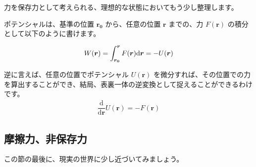 \documentclass[uplatex,dvipdfmx,a4paper,11pt]{jsarticle}
\begin{document}
力を保存力として考えられる、理想的な状態においてもう少し整理します。

ポテンシャルは、基準の位置 $\bm{r_0}$ から、任意の位置 $\bm{r}$ までの、力 $F(\bm{r})$ の積分として以下のように書けます。

	\begin{align*}
		W(\bm{r}) = \int_{\bm{r_0}}^{\bm{r}} F(\bm{r}) \mathrm{d} \bm{r} = -U(\bm{r})
	\end{align*}

逆に言えば、任意の位置でポテンシャル $U(\bm{r})$ を微分すれば、その位置での力を算出することができ、結局、表裏一体の逆変換として捉えることができるわけです。
\begin{align*}
	\dfrac{\mathrm{d}}{\mathrm{d}\bm{r}} U(\bm{r}) = -F(\bm{r})
\end{align*}



\subsection{摩擦力、非保存力}

この節の最後に、現実の世界に少し近づいてみましょう。
\end{document}
